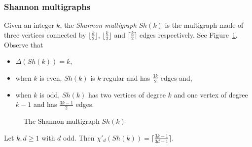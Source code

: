 

\subsubsection*{Shannon multigraphs}

Given an integer $k$, the \emph{Shannon multigraph} $Sh(k)$ is the multigraph made of three vertices connected by $\lfloor \frac{k}{2} \rfloor$, $\lfloor \frac{k}{2} \rfloor$ and $\lceil \frac{k}{2} \rceil$ edges respectively. See Figure~\ref{fig:shanon}. Observe that 
\begin{itemize}
    \item $\Delta(Sh(k))=k$,
    \item  when $k$ is even, $Sh(k)$ is $k$-regular and has $\frac{3k}{2}$ edges and,
    \item when $k$ is odd, $Sh(k)$ has two vertices of degree $k$ and one vertex of degree $k-1$ and has $\frac{3k-1}{2}$ edges. 
\end{itemize}

    \begin{figure}[H]
    \centering
    \caption{The Shannon multigraph $Sh(k)$} \label{fig:shanon}
    \end{figure}


\begin{lemma}\label{lem:shannon_tight}
Let $k,d \geq 1$ with $d$ odd. Then $\chi'_d(Sh(k)) = \lceil\frac{3k-1}{3d-1}\rceil$. 
\end{lemma}

